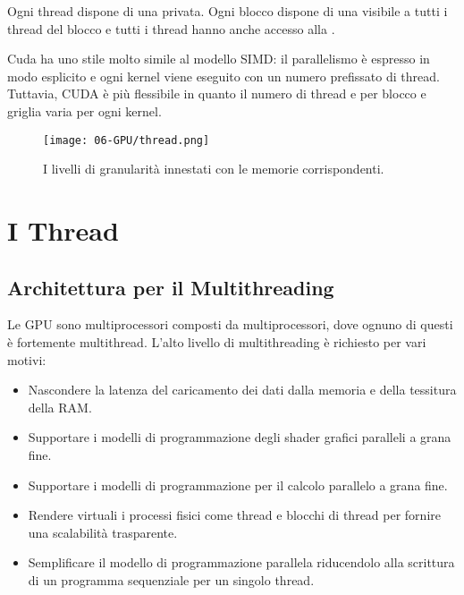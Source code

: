 Ogni thread dispone di una  privata. Ogni blocco dispone di una  visibile a tutti i thread del blocco e tutti i thread hanno anche accesso alla .

Cuda ha uno stile molto simile al modello SIMD: il parallelismo è espresso in modo esplicito e ogni kernel viene eseguito con un numero prefissato di thread. Tuttavia, CUDA è più flessibile in quanto il numero di thread e per blocco e griglia varia per ogni kernel.

\begin{figure}[h]
    \centering
    \texttt{[image: 06-GPU/thread.png]}
    \caption{I livelli di granularità innestati con le memorie corrispondenti.}
\end{figure}


\section{I Thread}

\subsection{Architettura per il Multithreading}

Le GPU sono multiprocessori composti da multiprocessori, dove ognuno di questi è fortemente multithread. L'alto livello di multithreading è richiesto per vari motivi: 

\begin{itemize}
  \item Nascondere la latenza del caricamento dei dati dalla memoria e della tessitura della RAM. 
  \item Supportare i modelli di programmazione degli shader grafici paralleli a grana fine. 
  \item Supportare i modelli di programmazione per il calcolo parallelo a grana fine. 
  \item Rendere virtuali i processi fisici come thread e blocchi di thread per fornire una scalabilità trasparente. 
  \item Semplificare il modello di programmazione parallela riducendolo alla scrittura di un programma sequenziale per un singolo thread.
\end{itemize}

\subsubsection{}

